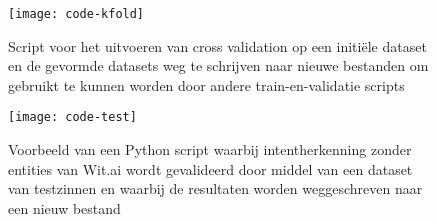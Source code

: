 \begin{figure}[H]
    \label{fig:code-kfold}
    \centering
    \texttt{[image: code-kfold]}
    \caption{Script voor het uitvoeren van cross validation op een initiële dataset en de gevormde datasets weg te schrijven naar nieuwe bestanden om gebruikt te kunnen worden door andere train-en-validatie scripts}
\end{figure}

\begin{figure}[H]
    \label{fig:code-validatie}
    \centering
    \texttt{[image: code-test]}
    \caption{Voorbeeld van een Python script waarbij intentherkenning zonder entities van Wit.ai wordt gevalideerd door middel van een dataset van testzinnen en waarbij de resultaten worden weggeschreven naar een nieuw bestand}
\end{figure}

























